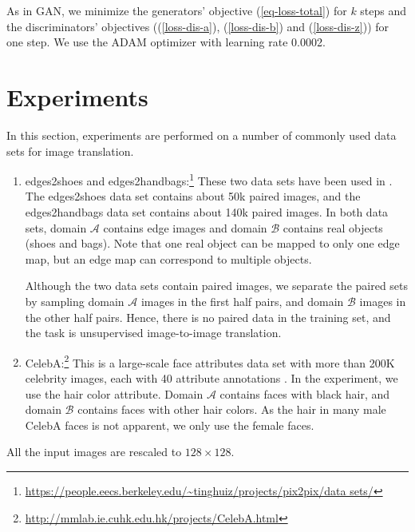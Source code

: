 \documentclass[conference]{IEEEtran}
\theoremstyle{definition}
\begin{document}
As in GAN, we minimize the generators' objective (\ref{eq-loss-total}) for $k$ steps and the discriminators' objectives ((\ref{loss-dis-a}),
(\ref{loss-dis-b}) and (\ref{loss-dis-z})) for one step. We use the ADAM optimizer \cite{kingma2014adam} with learning rate 0.0002.

\section{Experiments}
\label{sec-exp}
In this section, experiments are performed on a number of commonly used data sets for image translation.

\begin{enumerate}
\item 
{\sf edges2shoes} and {\sf edges2handbags}:\footnote{\url{https://people.eecs.berkeley.edu/~tinghuiz/projects/pix2pix/data sets/}}
These two data sets  
have been used in \cite{isola2016image}.
The {\sf edges2shoes} data set contains about 50k paired images, and the {\sf edges2handbags} data set contains about 140k paired images. In both data sets, domain $\mathcal A$ contains edge images and domain $\mathcal B$ contains real objects (shoes and bags). Note that one real object can be mapped to only one edge map, but an edge map can correspond to multiple objects. 
	
Although the two data sets contain paired images, we separate the paired sets by sampling domain $\mathcal A$ images in the first half pairs, and domain $\mathcal B$ images in the other half pairs. Hence, there is no paired data in the training set, and the task is unsupervised image-to-image translation.
	
\item {\sf CelebA}:\footnote{\url{http://mmlab.ie.cuhk.edu.hk/projects/CelebA.html}} 
This is a large-scale face attributes data set with more than 200K celebrity images, each with 40 attribute annotations
\cite{liu2015deep}.
In the experiment, we use the hair color attribute. Domain $\mathcal A$ contains faces with black hair, and domain $\mathcal B$ contains faces
with other hair colors. As the hair in many male {\sf CelebA} faces is not apparent, we only use the female faces.	
\end{enumerate}
All the input images are rescaled to $128\times 128$.
\end{document}
